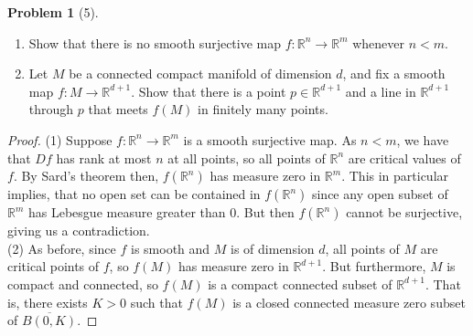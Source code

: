 \documentclass[reqno]{amsart}
\theoremstyle{definition}
\newtheorem{problem}[theorem]{Problem}
\theoremstyle{remark}
\begin{document}
    \begin{problem}[5]
        \begin{enumerate}
            \item Show that there is no smooth surjective map
                $f \colon \mathbb{R}^{n} \to 
                \mathbb{R}^{m}$ whenever
                $n < m$.
            \item Let $M$ be a connected compact manifold
                of dimension $d$, and fix a smooth
                map $f \colon M \to \mathbb{R}^{d+1}$.
                Show that there is a point
                $p \in \mathbb{R}^{d+1}$ and a
                line in $\mathbb{R}^{d+1}$ through
                $p$ that meets $f(M)$ in finitely
                many points.
        \end{enumerate}
    \end{problem}

    \begin{proof}
        (1) Suppose $f \colon \mathbb{R}^{n} \to 
        \mathbb{R}^{m}$ is a smooth surjective map.
        As $n < m$, we have that
        $Df$ has rank at most $n$ at all points, so
        all points of  $\mathbb{R}^{n}$ are critical values
        of $f$. By Sard's theorem then,
        $f\left( \mathbb{R}^{n} \right) $ has
        measure zero in $\mathbb{R}^{m}$. This in particular implies,
        that no open set can be contained in
        $f\left( \mathbb{R}^{n} \right) $ since any
        open subset of $\mathbb{R}^{m}$ has Lebesgue measure
         greater than $0$. But then $f\left( \mathbb{R}^{n} \right) $ 
         cannot be surjective, giving us a contradiction.\\
         \linebreak
         (2) As before, since
         $f$ is smooth and $M$ is of dimension $d$, all
         points of $M$ are critical points of
         $f$, so $f(M)$ has measure zero in 
         $\mathbb{R}^{d+1}$. But furthermore,
         $M$ is compact and connected, so
         $f(M)$ is a compact connected subset of
         $\mathbb{R}^{d+1}$. That is,
         there exists $K > 0$ such that
         $f(M)$ is a closed connected measure zero subset
         of $\overline{B \left( 0,K \right) }$.
     \end{proof}



\end{document}
